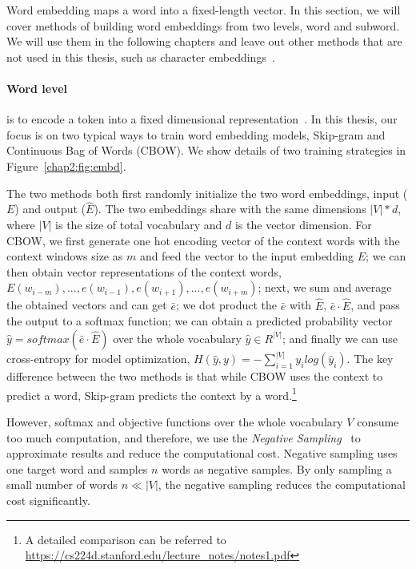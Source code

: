 Word embedding maps a word into a fixed-length vector. 
In this section, we will cover methods of building word embeddings from two levels, word and subword. 
We will use them in the following chapters and leave out other methods that are not used in this thesis, such as character embeddings~\cite{zhang2015character}.

\paragraph{Word level} is to encode a token into a fixed dimensional representation~\cite{mikolov2013distributed, pennington2014glove}. 
In this thesis, our focus is on two typical ways to train word embedding models, Skip-gram and Continuous Bag of Words (CBOW).
We show details of two training strategies in Figure~\ref{chap2:fig:embd}.

The two methods both first randomly initialize the two word embeddings, input ($E$) and output ($\hat{E}$).
The two embeddings share with the same dimensions $|V| * d$, where $|V|$ is the size of total vocabulary and $d$ is the vector dimension.
For CBOW, we first generate one hot encoding vector of the context words with the context windows size as $m$ and feed the vector to the input embedding $E$; we can then obtain vector representations of the context words, $E(w_{i-m}), ..., e(w_{i-1}), e(w_{i+1}), ..., e(w_{i+m})$; next, we sum and average the obtained vectors and can get $\bar{e}$; we dot product the $\bar{e}$ with $\hat{E}$, $\bar{e} \cdot \hat{E} $, and pass the output to a softmax function; we can obtain a predicted probability vector $\hat{y} = softmax(\bar{e} \cdot \hat{E})$ over the whole vocabulary $\hat{y} \in R^{|V|}$; and finally we can use cross-entropy for model optimization, $H(\hat{y}, y) = -\sum^{|V|}_{i=1}y_ilog(\hat{y}_i)$.
The key difference between the two methods is that while CBOW uses the context to predict a word, Skip-gram predicts the context by a word.\footnote{A detailed comparison can be referred to \url{https://cs224d.stanford.edu/lecture_notes/notes1.pdf}}

However, softmax and objective functions over the whole vocabulary $V$ consume too much computation, and therefore, we use the \textit{Negative Sampling}~\cite{mikolov2013distributed} to approximate results and reduce the computational cost.
Negative sampling uses one target word and samples $n$ words as negative samples.
By only sampling a small number of words $n \ll |V|$, the negative sampling reduces the computational cost significantly.

